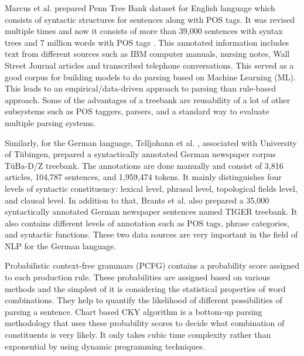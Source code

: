 \documentclass[a4paper, 11pt]{article}
\begin{document}

Marcus et al.\parencite{Marcus1993} prepared Penn Tree Bank dataset for English language which consists of syntactic structures for sentences along with POS tags. It was revised multiple times and now it consists of more than 39,000 sentences with syntax trees and 7 million words with POS tags \parencite{Taylor2003}. This annotated information includes text from different sources such as IBM computer manuals, nursing notes, Wall Street Journal articles and transcribed telephone conversations. This served as a good corpus for building models to do parsing based on Machine Learning (ML). This leads to an empirical/data-driven approach to parsing than rule-based approach. Some of the advantages of a treebank are reusability of a lot of other subsystems such as POS taggers, parsers, and a standard way to evaluate multiple parsing systems. 

Similarly, for the German language, Telljohann et al. \parencite{TubingenTreebank}, \parencite{Telljohann04thetuba} associated with University of Tübingen, prepared a syntactically annotated German newspaper corpus TüBa-D/Z treebank. The annotations are done manually and consist of 3,816 articles, 104,787 sentences, and 1,959,474 tokens. It mainly distinguishes four levels of syntactic constituency: lexical level, phrasal level, topological fields level, and clausal level. In addition to that, Brants et al. \parencite{Brants2002TheTT} also prepared a 35,000 syntactically annotated German newspaper sentences named TIGER treebank. It also contains different levels of annotation such as POS tags, phrase categories, and syntactic functions. These two data sources are very important in the field of NLP for the German language. 


Probabilistic context-free grammars (PCFG) \parencite{4569603} contains a probability score assigned to each production rule. These probabilities are assigned based on various methods and the simplest of it is considering the statistical properties of word combinations. They help to quantify the likelihood of different possibilities of parsing a sentence. Chart based CKY \parencite{YOUNGER1967189} algorithm is a bottom-up parsing methodology that uses these probability scores to decide what combination of constituents is very likely. It only takes cubic time complexity rather than exponential by using dynamic programming techniques. 
\end{document}
